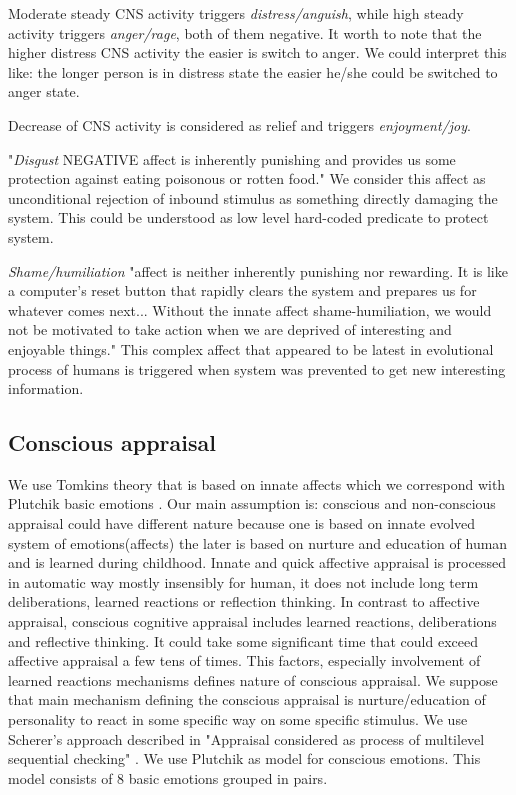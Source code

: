 Moderate steady CNS activity triggers \emph{distress/anguish}, while high steady activity triggers \emph{anger/rage}, both of them negative.
It worth to note that the higher distress CNS activity the easier is switch to anger. We could interpret this like: the longer person is in distress state the easier he/she could be switched to anger state.

Decrease of CNS activity is considered as relief and triggers \emph{enjoyment/joy}.

"\emph{Disgust} NEGATIVE affect is inherently punishing and provides us some protection against eating poisonous or rotten food." We consider this affect as unconditional rejection of inbound stimulus as something directly damaging the system. This could be understood as low level hard-coded predicate to protect system.

\emph{Shame/humiliation} "affect is neither inherently punishing nor rewarding. It is like a computer's reset button that rapidly clears the system and prepares us for whatever comes next... Without the innate affect shame-humiliation, we would not be motivated to take action when we are deprived of interesting and enjoyable things." This complex affect that appeared to be latest in evolutional process of humans is triggered when system was prevented to get new interesting information.

\subsection{Conscious appraisal}

We use Tomkins theory that is based on innate affects which we correspond with Plutchik basic emotions \cite{natureofemotions}. Our main assumption is: conscious and non-conscious appraisal could have different nature because one is based on innate evolved system of emotions(affects) the later is based on nurture and education of human and is learned during childhood. Innate and quick affective appraisal is processed in automatic way mostly insensibly for human, it does not include long term deliberations, learned reactions or reflection thinking. In contrast to affective appraisal, conscious cognitive appraisal includes learned reactions, deliberations and reflective thinking. It could take some significant time that could exceed affective appraisal a few tens of times. This factors, especially involvement of learned reactions mechanisms defines nature of conscious appraisal. We suppose that main mechanism defining the conscious appraisal is nurture/education of personality to react in some specific way on some specific stimulus. We use Scherer's approach described in "Appraisal considered as process of multilevel sequential checking" \cite{appraisal_considered_as_a_process}. We use Plutchik \cite{natureofemotions} as model for conscious emotions. This model consists of 8 basic emotions grouped in pairs.

